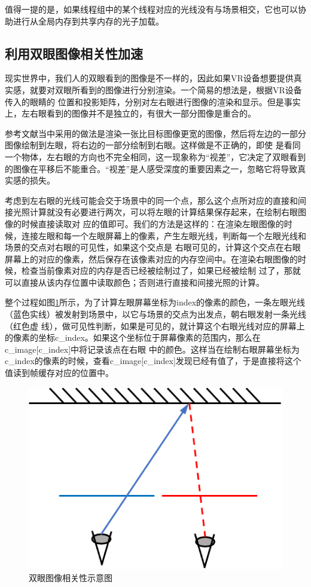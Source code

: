 \documentclass[UTF8]{ctexart}
\begin{document}
        值得一提的是，如果线程组中的某个线程对应的光线没有与场景相交，它也可以协助进行从全局内存到共享内存的光子加载。
    \subsection{利用双眼图像相关性加速}
        现实世界中，我们人的双眼看到的图像是不一样的，因此如果VR设备想要提供真实感，就要对双眼所看到的图像进行分别渲染。一个简易的想法是，根据VR设备传入的眼睛的
        位置和投影矩阵，分别对左右眼进行图像的渲染和显示。但是事实上，左右眼看到的图像并不是独立的，有很大一部分图像是重合的。
        
        参考文献\cite{fujita2014foveated}当中采用的做法是渲染一张比目标图像更宽的图像，然后将左边的一部分图像绘制到左眼，将右边的一部分绘制到右眼。这样做是不正确的，即使
        是看同一个物体，左右眼的方向也不完全相同，这一现象称为“视差”，它决定了双眼看到的图像在平移后不能重合。“视差”是人感受深度的重要因素之一，忽略它将导致真实感的损失。
        
        考虑到左右眼的光线可能会交于场景中的同一个点，那么这个点所对应的直接和间接光照计算就没有必要进行两次，可以将左眼的计算结果保存起来，在绘制右眼图像的时候直接读取对
        应的值即可。我们的方法是这样的：在渲染左眼图像的时候，连接左眼和每一个左眼屏幕上的像素，产生左眼光线，判断每一个左眼光线和场景的交点对右眼的可见性，如果这个交点是
        右眼可见的，计算这个交点在右眼屏幕上的对应的像素，然后保存在该像素对应的内存空间中。在渲染右眼图像的时候，检查当前像素对应的内存是否已经被绘制过了，如果已经被绘制
        过了，那就可以直接从该内存位置中读取颜色；否则进行直接和间接光照的计算。
        
        整个过程如图\ref{fig:3}所示，为了计算左眼屏幕坐标为index的像素的颜色，一条左眼光线（蓝色实线）被发射到场景中，以它与场景的交点为出发点，朝右眼发射一条光线（红色虚
        线），做可见性判断，如果是可见的，就计算这个右眼光线对应的屏幕上的像素的坐标c\_index。如果这个坐标位于屏幕像素的范围内，那么在c\_image[c\_index]中将记录该点在右眼
        中的颜色。这样当在绘制右眼屏幕坐标为c\_index的像素的时候，查看c\_image[c\_index]发现已经有值了，于是直接将这个值读到帧缓存对应的位置中。
        
        \begin{figure}[htbp]
        \centering
        \includegraphics[scale=0.6]{pic/BinocularCorrelation.png}
        \caption{双眼图像相关性示意图}
        \label{fig:3}
        \end{figure}
        
\end{document}
